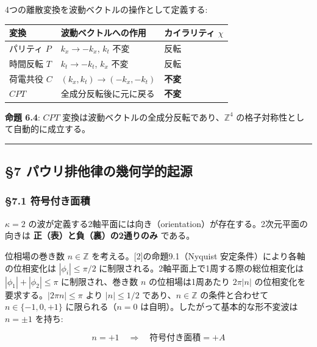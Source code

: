 \documentclass[
  a4paper,11pt]{ltjsarticle}
\newcounter{none}
\theoremstyle{definition}
\theoremstyle{remark}
\begin{document}
4つの離散変換を波動ベクトルの操作として定義する:

{\def\LTcaptype{none} %
\begin{longtable}[]{@{}lll@{}}
\toprule\noalign{}
変換 & 波動ベクトルへの作用 & カイラリティ \(\chi\) \\
\midrule\noalign{}
\endhead
\bottomrule\noalign{}
\endlastfoot
パリティ \(P\) & \(k_x \to -k_x\), \(k_t\) 不変 & 反転 \\
時間反転 \(T\) & \(k_t \to -k_t\), \(k_x\) 不変 & 反転 \\
荷電共役 \(C\) & \((k_x, k_t) \to (-k_x, -k_t)\) & \textbf{不変} \\
\(CPT\) & 全成分反転後に元に戻る & \textbf{不変} \\
\end{longtable}
}

\textbf{命題 6.4}: \(CPT\)
変換は波動ベクトルの全成分反転であり、\(\mathbb{Z}^4\)
の格子対称性として自動的に成立する。

\begin{center}\rule{0.5\linewidth}{0.5pt}\end{center}

\subsection{§7
パウリ排他律の幾何学的起源}\label{ux30d1ux30a6ux30eaux6392ux4ed6ux5f8bux306eux5e7eux4f55ux5b66ux7684ux8d77ux6e90}

\subsubsection{§7.1
符号付き面積}\label{ux7b26ux53f7ux4ed8ux304dux9762ux7a4d}

\(\kappa = 2\)
の波が定義する2軸平面には向き（orientation）が存在する。2次元平面の向きは
\textbf{正（表）と負（裏）の2通りのみ} である。

位相場の巻き数 \(n \in \mathbb{Z}\) を考える。{[}2{]}の命題9.1（Nyquist
安定条件）により各軸の位相変化は \(|\phi_i| \leq \pi/2\)
に制限される。2軸平面上で1周する際の総位相変化は
\(|\phi_1| + |\phi_2| \leq \pi\) に制限され、巻き数 \(n\)
の位相場は1周あたり \(2\pi |n|\)
の位相変化を要求する。\(|2\pi n| \leq \pi\) より \(|n| \leq 1/2\)
であり、\(n \in \mathbb{Z}\) の条件と合わせて \(n \in \{-1, 0, +1\}\)
に限られる（\(n = 0\) は自明）。したがって基本的な形不変波は
\(n = \pm 1\) を持ち:

\[n = +1 \quad \Rightarrow \quad \text{符号付き面積} = +A\]
\end{document}
